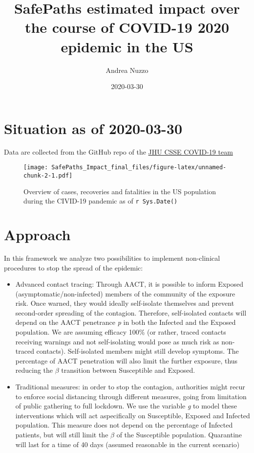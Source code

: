 \documentclass[]{article}
\title{SafePaths estimated impact over the course of COVID-19 2020 epidemic in
the US}
\author{Andrea Nuzzo}
\date{2020-03-30}
\providecommand{\tightlist}{%
  \setlength{\itemsep}{0pt}\setlength{\parskip}{0pt}}
\begin{document}
\maketitle

{
\setcounter{tocdepth}{2}
\tableofcontents
}
\hypertarget{situation-as-of-2020-03-30}{%
\section{Situation as of 2020-03-30}\label{situation-as-of-2020-03-30}}

Data are collected from the GitHub repo of the
\href{https://doi.org/10.1016/S1473-3099(20)30120-1}{JHU CSSE COVID-19
team}

\begin{figure}
\centering
\texttt{[image: SafePaths\_Impact\_final\_files/figure-latex/unnamed-chunk-2-1.pdf]}
\caption{Overview of cases, recoveries and fatalities in the US
population during the CIVID-19 pandemic as of \texttt{r\ Sys.Date()}}
\end{figure}

\hypertarget{approach}{%
\section{Approach}\label{approach}}

In this framework we analyze two possibilities to implement non-clinical
procedures to stop the spread of the epidemic:

\begin{itemize}
\tightlist
\item
  Advanced contact tracing: Through AACT, it is possible to inform
  Exposed (asymptomatic/non-infected) members of the community of the
  exposure risk. Once warned, they would ideally self-isolate themselves
  and prevent second-order spreading of the contagion. Therefore,
  self-isolated contacts will depend on the AACT penetrance \emph{p} in
  both the Infected and the Exposed population. We are assuming efficacy
  100\% (or rather, traced contacts receiving warnings and not
  self-isolating would pose as much risk as non-traced contacts).
  Self-isolated members might still develop symptoms. The percentage of
  AACT penetration will also limit the further exposure, thus reducing
  the \(\beta\) transition between Susceptible and Exposed.
\item
  Traditional measures: in order to stop the contagion, authorities
  might recur to enforce social distancing through different measures,
  going from limitation of public gathering to full lockdown. We use the
  variable \emph{g} to model these interventions which will act
  aspecifically on Susceptible, Exposed and Infected population. This
  measure does not depend on the percentage of Infected patients, but
  will still limit the \(\beta\) of the Susceptible population.
  Quarantine will last for a time of 40 days (assumed reasonable in the
  current scenario)
\end{itemize}
\end{document}
